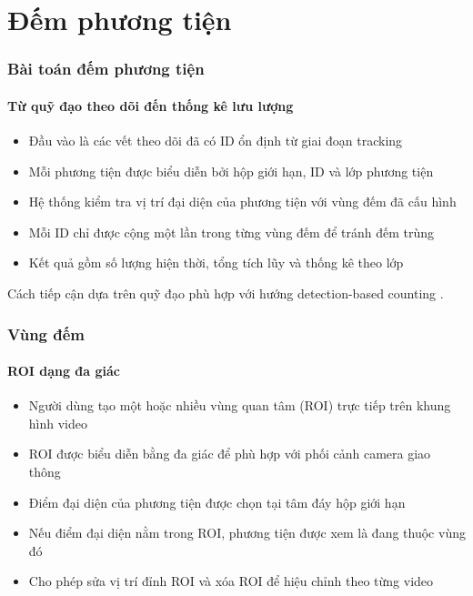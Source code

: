 \section{Đếm phương tiện}

\begin{frame}
\frametitle{Bài toán đếm phương tiện}
\framesubtitle{Từ quỹ đạo theo dõi đến thống kê lưu lượng}

\begin{itemize}[<+->]
  \item Đầu vào là các vết theo dõi đã có ID ổn định từ giai đoạn tracking
  \item Mỗi phương tiện được biểu diễn bởi hộp giới hạn, ID và lớp phương tiện
  \item Hệ thống kiểm tra vị trí đại diện của phương tiện với vùng đếm đã cấu
        hình
  \item Mỗi ID chỉ được cộng một lần trong từng vùng đếm để tránh đếm trùng
  \item Kết quả gồm số lượng hiện thời, tổng tích lũy và thống kê theo lớp
\end{itemize}

\vspace{0.2cm}

{\scriptsize Cách tiếp cận dựa trên quỹ đạo phù hợp với hướng
detection-based counting \cite{dai2019,shokri2025}.}

\end{frame}

\begin{frame}
\frametitle{Vùng đếm}
\framesubtitle{ROI dạng đa giác}

\begin{itemize}[<+->]
  \item Người dùng tạo một hoặc nhiều vùng quan tâm (ROI) trực tiếp trên khung
        hình video
  \item ROI được biểu diễn bằng đa giác để phù hợp với phối cảnh camera giao
        thông
  \item Điểm đại diện của phương tiện được chọn tại tâm đáy hộp giới hạn
  \item Nếu điểm đại diện nằm trong ROI, phương tiện được xem là đang thuộc
        vùng đó
  \item Cho phép sửa vị trí đỉnh ROI và xóa ROI để hiệu chỉnh theo từng video
\end{itemize}

\end{frame}

